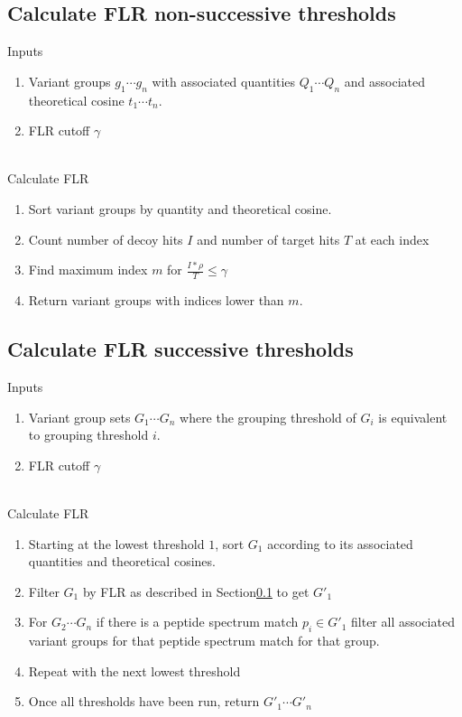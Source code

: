 \documentclass[11pt]{article}
\begin{document}
\subsection{Calculate FLR non-successive thresholds}\label{sec:FLR}
Inputs 
\begin{enumerate}
\item Variant groups $g_1 \cdots g_n$ with associated quantities $Q_1 \cdots Q_n$ and associated theoretical cosine $t_1 \cdots t_n$. 
\item FLR cutoff $\gamma$
\end{enumerate}
\\
Calculate FLR
\begin{enumerate}
\item Sort variant groups by quantity and theoretical cosine. 
\item Count number of decoy hits $I$ and number of target hits $T$ at each index
\item Find maximum index $m$ for $\frac{I*\rho}{T} \leq \gamma$
\item Return variant groups with indices lower than $m$.
\end{enumerate}

\subsection{Calculate FLR successive thresholds}
Inputs
\begin{enumerate}
\item Variant group sets $G_1 \cdots G_n$ where the grouping threshold of $G_i$ is equivalent to grouping threshold $i$.
\item FLR cutoff $\gamma$
\end{enumerate}
\\
Calculate FLR
\begin{enumerate}
\item Starting at the lowest threshold $1$, sort $G_1$ according to its associated quantities and theoretical cosines. 
\item Filter $G_1$ by FLR as described in Section\ref{sec:FLR} to get $G'_1$
\item For $G_2 \cdots G_n$ if there is a peptide spectrum match $p_i \in G'_1$ filter all associated variant groups for that peptide spectrum match for that group.
\item Repeat with the next lowest threshold
\item Once all thresholds have been run, return $G'_1 \cdots G'_n$
\end{enumerate}
\end{document}
